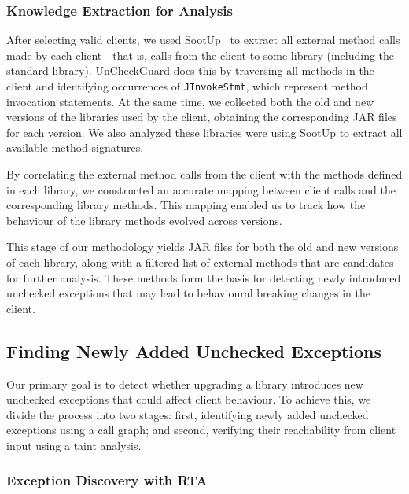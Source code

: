 
\subsubsection{Knowledge Extraction for Analysis}

After selecting valid clients, we used SootUp~\cite{Karakaya24:_sootup} to extract all external method calls made by each client---that is, calls from the client to some library (including the standard library). UnCheckGuard does this by traversing all methods in the client and identifying occurrences of \texttt{JInvokeStmt}, which represent method invocation statements. At the same time, we collected both the old and new versions of the libraries used by the client, obtaining the corresponding JAR files for each version. We also analyzed these libraries were using SootUp to extract all available method signatures.

By correlating the external method calls from the client with the methods defined in each library, we constructed an accurate mapping between client calls and the corresponding library methods. This mapping enabled us to track how the behaviour of the library methods evolved across versions.

This stage of our methodology yields JAR files for both the old and new versions of each library, along with a filtered list of external methods that are candidates for further analysis. These methods form the basis for detecting newly introduced unchecked exceptions that may lead to behavioural breaking changes in the client.

\subsection{Finding Newly Added Unchecked Exceptions}

Our primary goal is to detect whether upgrading a library introduces new unchecked exceptions that could affect client behaviour. To achieve this, we divide the process into two stages: first, identifying newly added unchecked exceptions using a call graph; and second, verifying their reachability from client input using a taint analysis.

\subsubsection{Exception Discovery with RTA}

